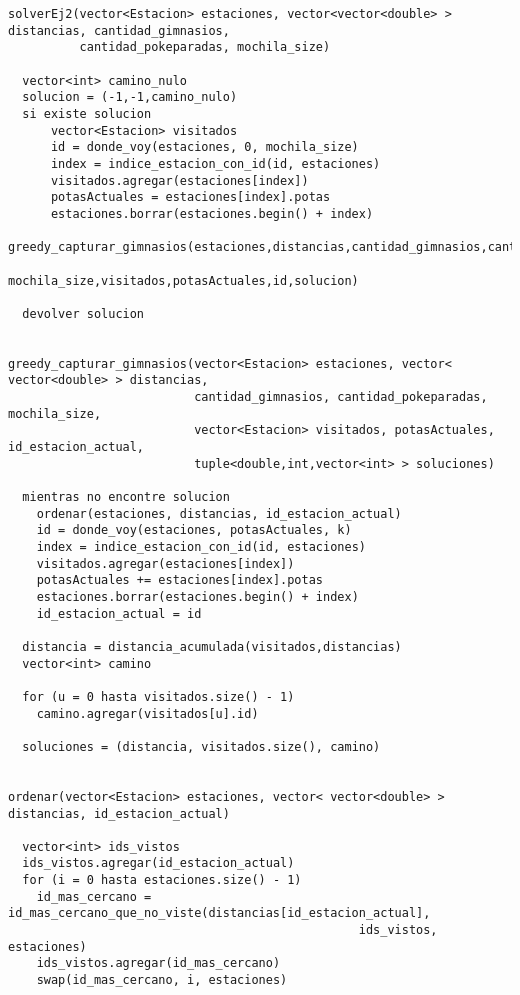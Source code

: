             \begin{codesnippet}
            \begin{verbatim}
solverEj2(vector<Estacion> estaciones, vector<vector<double> > distancias, cantidad_gimnasios,
          cantidad_pokeparadas, mochila_size)
  
  vector<int> camino_nulo
  solucion = (-1,-1,camino_nulo)
  si existe solucion 
      vector<Estacion> visitados
      id = donde_voy(estaciones, 0, mochila_size)
      index = indice_estacion_con_id(id, estaciones)
      visitados.agregar(estaciones[index])
      potasActuales = estaciones[index].potas
      estaciones.borrar(estaciones.begin() + index)
      greedy_capturar_gimnasios(estaciones,distancias,cantidad_gimnasios,cantidad_pokeparadas,
                                mochila_size,visitados,potasActuales,id,solucion)
  
  devolver solucion


greedy_capturar_gimnasios(vector<Estacion> estaciones, vector< vector<double> > distancias, 
                          cantidad_gimnasios, cantidad_pokeparadas, mochila_size, 
                          vector<Estacion> visitados, potasActuales, id_estacion_actual, 
                          tuple<double,int,vector<int> > soluciones)

  mientras no encontre solucion 
    ordenar(estaciones, distancias, id_estacion_actual)
    id = donde_voy(estaciones, potasActuales, k)
    index = indice_estacion_con_id(id, estaciones)
    visitados.agregar(estaciones[index])
    potasActuales += estaciones[index].potas
    estaciones.borrar(estaciones.begin() + index)
    id_estacion_actual = id

  distancia = distancia_acumulada(visitados,distancias)
  vector<int> camino

  for (u = 0 hasta visitados.size() - 1)
    camino.agregar(visitados[u].id)

  soluciones = (distancia, visitados.size(), camino)


ordenar(vector<Estacion> estaciones, vector< vector<double> > distancias, id_estacion_actual)

  vector<int> ids_vistos
  ids_vistos.agregar(id_estacion_actual)
  for (i = 0 hasta estaciones.size() - 1)
    id_mas_cercano = id_mas_cercano_que_no_viste(distancias[id_estacion_actual], 
                                                 ids_vistos, estaciones)
    ids_vistos.agregar(id_mas_cercano)
    swap(id_mas_cercano, i, estaciones)
  

            \end{verbatim}
            \end{codesnippet}






